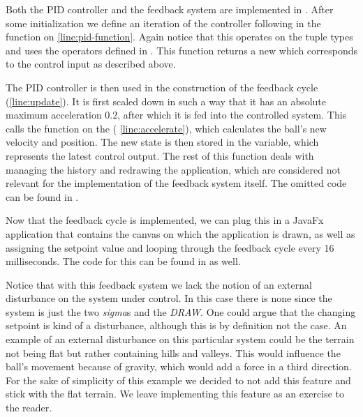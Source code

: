 Both the PID controller and the feedback system are implemented in . After some initialization we define an iteration of the controller following  in the  function on \cref{line:pid-function}. Again notice that this operates on the tuple types and uses the operators defined in . This function returns a new  which corresponds to the control input as described above.

The PID controller is then used in the construction of the feedback cycle (\cref{line:update}). It is first scaled down in such a way that it has an absolute maximum acceleration $0.2$, after which it is fed into the controlled system. This calls the  function on the  ( \cref{line:accelerate}), which calculates the ball's new velocity and position. The new state is then stored in the  variable, which represents the latest control output. The rest of this function deals with managing the history and redrawing the application, which are considered not relevant for the implementation of the feedback system itself. The omitted code can be found in .

Now that the feedback cycle is implemented, we can plug this in a JavaFx application that contains the canvas on which the application is drawn, as well as assigning the setpoint value and looping through the feedback cycle every 16 milliseconds. The code for this can be found in  as well.

Notice that with this feedback system we lack the notion of an external disturbance on the system under control. In this case there is none since the system is just the two \textit{sigma}s and the \textit{DRAW}. One could argue that the changing setpoint is kind of a disturbance, although this is by definition not the case. An example of an external disturbance on this particular system could be the terrain not being flat but rather containing hills and valleys. This would influence the ball's movement because of gravity, which would add a force in a third direction. For the sake of simplicity of this example we decided to not add this feature and stick with the flat terrain. We leave implementing this feature as an exercise to the reader.

